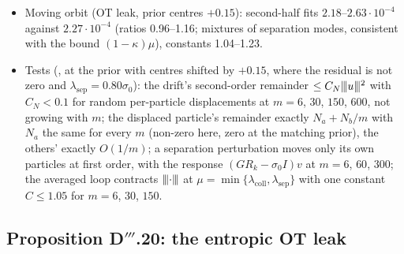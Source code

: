 \begin{itemize}
    $W^2$ grows to 0.79, 0.20 under the nearest-atom leak (the lifts of $(19,21,20)/60$ and $(79,81,80)/240$: 0.8655,
    0.2163) and falls to $3.0\cdot10^{-3}$, $8.2\cdot10^{-4}$ under the OT leak.
  \item Moving orbit (OT leak, prior centres $+0.15$): second-half fits $2.18$--$2.63\cdot10^{-4}$ against
    $2.27\cdot10^{-4}$ (ratios 0.96--1.16; mixtures of separation modes, consistent with the bound $(1-\kappa)\mu$),
    constants 1.04--1.23.
  \item Tests (, at the prior with centres shifted by $+0.15$, where the residual is
    not zero and $\lambda_{\mathrm{sep}}=0.80\sigma_0$): the drift's second-order remainder $\le C_N\lvert\kern-0.25ex\lvert\kern-0.25ex\lvert u\rvert\kern-0.25ex\rvert\kern-0.25ex\rvert^2$ with
    $C_N<0.1$ for random per-particle displacements at $m=6$, $30$, $150$, $600$, not growing with $m$; the displaced
    particle's remainder exactly $N_a+N_b/m$ with $N_a$ the same for every $m$ (non-zero here, zero at the matching
    prior), the others' exactly $O(1/m)$; a separation perturbation moves only its own particles at first order, with
    the response $(GR_k-\sigma_0I)v$ at $m=6$, $60$, $300$; the averaged loop contracts $\lvert\kern-0.25ex\lvert\kern-0.25ex\lvert \cdot\rvert\kern-0.25ex\rvert\kern-0.25ex\rvert$ at
    $\mu=\min\{\lambda_{\mathrm{coll}},\lambda_{\mathrm{sep}}\}$ with one constant $C\le1.05$ for $m=6$, $30$, $150$.
\end{itemize}

\subsection{Proposition D\texorpdfstring{$'''$}{'''}.20: the entropic OT leak}

